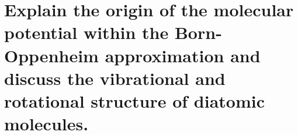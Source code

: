 \section{Explain the origin of the molecular potential within the Born-Oppenheim approximation and discuss the vibrational and rotational structure of diatomic molecules.}

\noindent
\Large

\normalsize